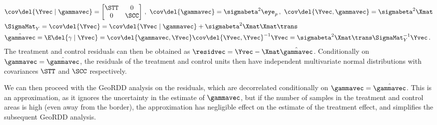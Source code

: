 \begin{equation}
    \begin{split}
        &
        \cov\del{\Yvec \mid \gammavec }
                = \begin{bmatrix}
                    \STT & 0 \\
                    0 & \SCC
                  \end{bmatrix}
            \,,\ 
            \cov\del{\gammavec} = \sigmabeta^2 \eye_p 
            \,,\  
            \cov\del{\Yvec, \gammavec} = \sigmabeta^2 \Xmat \\&
        \SigmaMat_Y = \cov\del{\Yvec} 
            = \cov\del{\Yvec \mid \gammavec}
                + \sigmabeta^2 \Xmat \Xmat\trans \\&
        \hat\gammavec 
            = \E\del{\gamma \mid \Yvec} 
            = \cov\del{\gammavec,\Yvec} \cov\del{\Yvec,\Yvec}^{-1} \Yvec
            = \sigmabeta^2 \Xmat\trans\SigmaMat_{Y}^{-1} \Yvec
        \,.
    \end{split}
\end{equation}
The treatment and control residuals can then be obtained as \(\residvec = \Yvec - \Xmat \hat\gammavec\).
Conditionally on \(\gammavec=\hat\gammavec\), the residuals of the treatment and control units then have independent multivariate normal distributions with covariances \(\STT\) and \(\SCC\) respectively.


We can then proceed with the GeoRDD analysis on the residuals, which are decorrelated conditionally on \(\gammavec=\hat\gammavec\).
This is an approximation, as it ignores the uncertainty in the estimate of \(\gammavec\), but if the number of samples in the treatment and control areas is high (even away from the border), the approximation has negligible effect on the estimate of the treatment effect, and simplifies the subsequent GeoRDD analysis.

